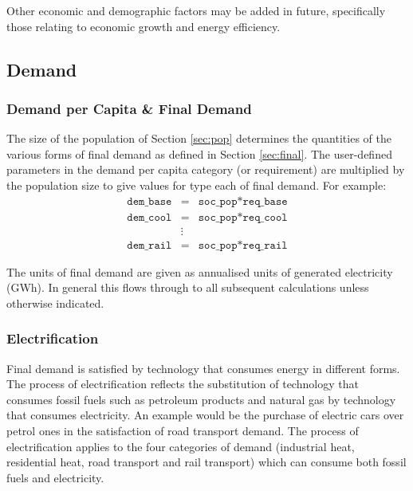 \documentclass[notitlepage,a4paper]{article}
\begin{document}
Other economic and demographic factors may be added in future, specifically those relating to economic growth and energy efficiency.

\subsection{Demand}

\subsubsection{Demand per Capita \& Final Demand}

The size of the population of Section \ref{sec:pop} determines the quantities of the various forms of final demand as defined in Section \ref{sec:final}. The user-defined parameters in the demand per capita category (or requirement) are multiplied by the population size to give values for type each of final demand.  For example:
\begin{eqnarray}
\texttt{dem\_base} &=& \texttt{soc\_pop} * \texttt{req\_base} \\
\texttt{dem\_cool} &=& \texttt{soc\_pop} * \texttt{req\_cool} \\
				&\vdots& \\
\texttt{dem\_rail} &=& \texttt{soc\_pop} * \texttt{req\_rail} 
\end{eqnarray}

The units of final demand are given as annualised units of generated electricity (GWh). In general this flows through to all subsequent calculations unless otherwise indicated.
 
 
\subsubsection{Electrification}

Final demand is satisfied by technology that consumes energy in different forms. The process of electrification reflects the substitution of technology that consumes fossil fuels such as petroleum products and natural gas by technology that consumes electricity.  An example would be the purchase of electric cars over petrol ones in the satisfaction of road transport demand. The process of electrification applies to the four categories of demand (industrial heat, residential heat, road transport and rail transport) which can consume both fossil fuels and electricity.
\end{document}

